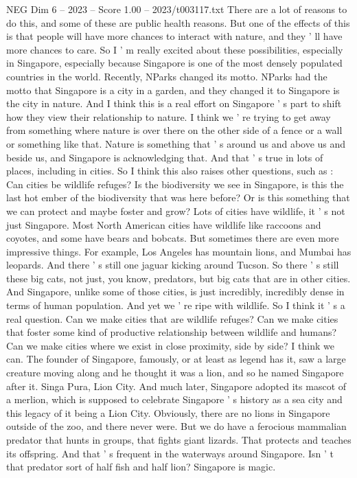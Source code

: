 \begin{textsample}{NEG Dim 6 – 2023 – Score 1.00 – 2023/t003117.txt}
There are a lot of reasons to do this, and some of these are public health reasons.
But one of the effects of this is that people will have more chances to interact with nature, and they ' ll have more chances to care.
So I ' m really excited about these possibilities, especially in Singapore, especially because Singapore is one of the most densely populated countries in the world.
Recently, NParks changed its motto.
NParks had the motto that Singapore is a city in a garden, and they changed it to Singapore is the city in nature.
And I think this is a real effort on Singapore ' s part to shift how they view their relationship to nature.
I think we ' re trying to get away from something where nature is over there on the other side of a fence or a wall or something like that.
Nature is something that ' s around us and above us and beside us, and Singapore is acknowledging that.
And that ' s true in lots of places, including in cities.
So I think this also raises other questions, such as : Can cities be wildlife refuges?
Is the biodiversity we see in Singapore, is this the last hot ember of the biodiversity that was here before?
Or is this something that we can protect and maybe foster and grow?
Lots of cities have wildlife, it ' s not just Singapore.
Most North American cities have wildlife like raccoons and coyotes, and some have bears and bobcats.
But sometimes there are even more impressive things.
For example, Los Angeles has mountain lions, and Mumbai has leopards.
And there ' s still one jaguar kicking around Tucson.
So there ' s still these big cats, not just, you know, predators, but big cats that are in other cities.
And Singapore, unlike some of those cities, is just incredibly, incredibly dense in terms of human population.
And yet we ' re ripe with wildlife.
So I think it ' s a real question.
Can we make cities that are wildlife refuges?
Can we make cities that foster some kind of productive relationship between wildlife and humans?
Can we make cities where we exist in close proximity, side by side?
I think we can.
The founder of Singapore, famously, or at least as legend has it, saw a large creature moving along and he thought it was a lion, and so he named Singapore after it.
Singa Pura, Lion City.
And much later, Singapore adopted its mascot of a merlion, which is supposed to celebrate Singapore ' s history as a sea city and this legacy of it being a Lion City.
Obviously, there are no lions in Singapore outside of the zoo, and there never were.
But we do have a ferocious mammalian predator that hunts in groups, that fights giant lizards.
That protects and teaches its offspring.
And that ' s frequent in the waterways around Singapore.
Isn ' t that predator sort of half fish and half lion?
Singapore is magic.

\end{textsample}
